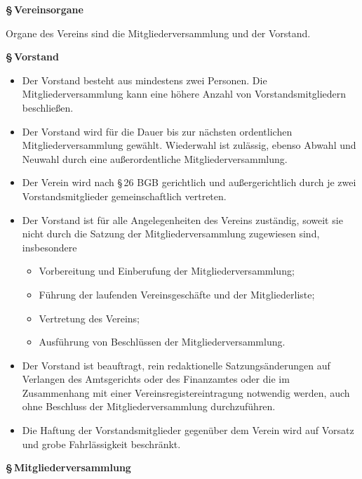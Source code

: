 \documentclass[11pt]{article}
\def\items#1{{%
  \itcounter0%
  \begin{itemize}
  #1
  \end{itemize}
}}
\let\it\item%
\def\item{
  \advance\itcounter1%
  \it[(\the\itcounter)]
}
\def\paragraf#1{
  \advance\itcounter1%
  \par\medskip
  {\large\bfseries \S\,\the\itcounter\quad#1}
  \par\smallskip
}
\begin{document}
\paragraf{Vereinsorgane}
\medskip

Organe des Vereins sind die Mitgliederversammlung und der Vorstand.
\bigskip

\paragraf{Vorstand}

\items{
   \item
     Der Vorstand besteht aus mindestens zwei Personen.
     Die Mitgliederversammlung kann eine h{\"o}here Anzahl von Vorstandsmitgliedern beschlie{\ss}en.
   \item
     Der Vorstand wird f\"ur die Dauer bis zur n\"achsten ordentlichen Mitgliederversammlung
     gew{\"a}hlt. Wiederwahl ist zul{\"a}ssig, ebenso Abwahl und Neuwahl durch eine au{\ss}erordentliche
     Mitgliederversammlung.
   \item
     Der Verein wird nach \S\,26 BGB gerichtlich und au{\ss}ergerichtlich durch je zwei
     Vorstandsmitglieder gemeinschaftlich vertreten.
   \item
     Der Vorstand ist f{\"u}r alle Angelegenheiten des Vereins zust{\"a}ndig, soweit sie nicht
     durch die Satzung der Mitgliederversammlung zugewiesen sind, insbesondere
     \items{
       \item Vorbereitung und Einberufung der Mitgliederversammlung;
       \item F{\"u}hrung der laufenden Vereinsgesch{\"a}fte und der Mitgliederliste;
       \item Vertretung des Vereins;
       \item Ausf{\"u}hrung von Beschl{\"u}ssen der Mitgliederversammlung.
     }
   \item
     Der Vorstand ist beauftragt, rein redaktionelle Satzungs{\"a}nderungen auf Verlangen
     des Amtsgerichts oder des Finanzamtes oder die im Zusammenhang mit einer Vereinsregistereintragung
     notwendig werden, auch ohne Beschluss der Mitgliederversammlung durchzuf{\"u}hren.
   \item
     Die Haftung der Vorstandsmitglieder gegen{\"u}ber dem Verein wird auf Vorsatz und grobe
     Fahr\-l{\"a}ssig\-keit %
     beschr{\"a}nkt.
}

\paragraf{Mitgliederversammlung}
\end{document}
